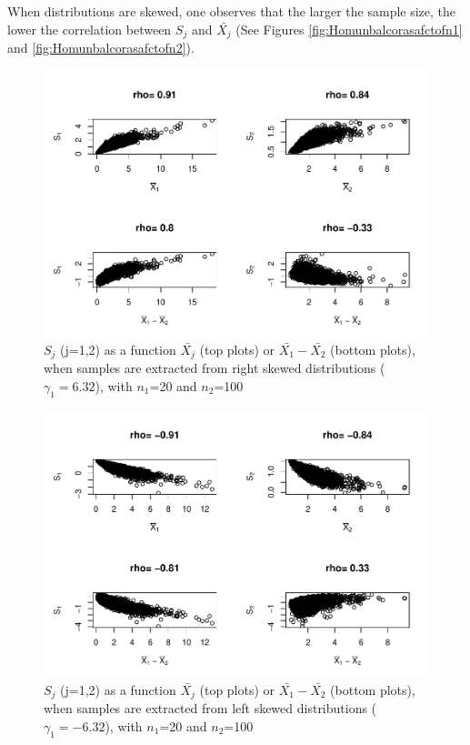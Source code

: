 \documentclass[
  english,
  man]{apa6}
\begin{document}
When distributions are skewed, one observes that the larger the sample size, the lower the correlation between \(S_j\) and \(\bar{X_j}\) (See Figures \ref{fig:Homunbalcorasafctofn1} and \ref{fig:Homunbalcorasafctofn2}).

\begin{figure}
\centering
\includegraphics{Correlation_files/figure-latex/pltSDHomunbalRskew-1.pdf}
\caption{\label{fig:pltSDHomunbalRskew}\(S_j\) (j=1,2) as a function \(\bar{X_j}\) (top plots) or \(\bar{X_1}-\bar{X_2}\) (bottom plots), when samples are extracted from right skewed distributions (\(\gamma_1 = 6.32\)), with \(n_1\)=20 and \(n_2\)=100}
\end{figure}

\begin{figure}
\centering
\includegraphics{Correlation_files/figure-latex/pltSDHomunbalLskew-1.pdf}
\caption{\label{fig:pltSDHomunbalLskew}\(S_j\) (j=1,2) as a function \(\bar{X_j}\) (top plots) or \(\bar{X_1}-\bar{X_2}\) (bottom plots), when samples are extracted from left skewed distributions (\(\gamma_1 = -6.32\)), with \(n_1\)=20 and \(n_2\)=100}
\end{figure}
\end{document}
